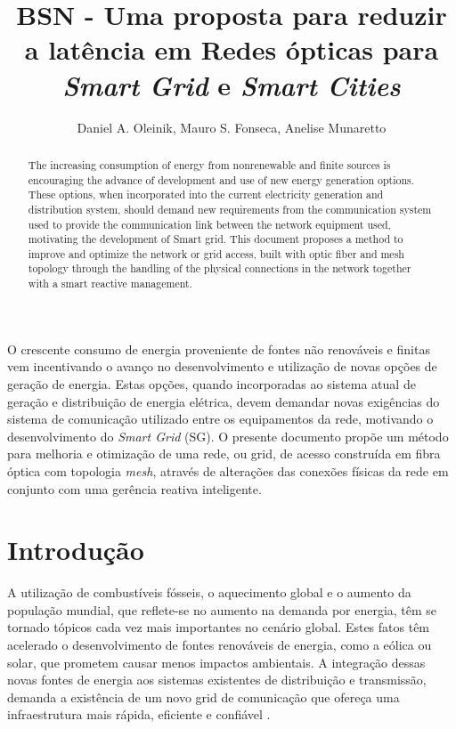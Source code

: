 \documentclass[12pt]{article}
\title{BSN - Uma proposta para reduzir a latência em Redes ópticas para \emph{Smart Grid} e \emph{Smart Cities}}
\author{Daniel A. Oleinik\inst{1}, Mauro S. Fonseca\inst{1}, Anelise Munaretto\inst{1}}
\begin{document}
 

\maketitle

\begin{abstract}
  The increasing consumption of energy from nonrenewable and finite sources is encouraging the advance of development and use
of new energy generation options. These options, when incorporated into the current electricity generation and distribution system,
should demand new requirements from the communication system used to provide the communication link between the network
equipment used, motivating the development of Smart grid. This document proposes a method to improve and optimize the network
or grid access, built with optic fiber and mesh topology through the handling of the physical connections in the network together with
a smart reactive management.
\end{abstract}
     
\begin{resumo} 
 O crescente consumo de energia proveniente de fontes não renováveis e finitas vem incentivando o avanço no desenvolvimento e utilização de novas opções de geração de energia. Estas opções, quando incorporadas ao sistema atual de geração e distribuição de energia elétrica, devem demandar novas exigências do sistema de comunicação utilizado entre os equipamentos da rede, motivando o desenvolvimento do \emph{Smart Grid} (SG). O presente documento propõe um método para melhoria e otimização de uma rede, ou grid, de acesso construída em fibra óptica com topologia \emph{mesh}, através de alterações das conexões físicas da rede em conjunto com uma gerência reativa inteligente.
\end{resumo}


\section{Introdução}

A utilização de combustíveis fósseis, o aquecimento global e o aumento da população mundial, que reflete-se no aumento na demanda por energia, têm se tornado tópicos cada vez mais importantes no cenário global. Estes fatos têm acelerado o desenvolvimento de fontes renováveis de energia, como a eólica ou solar, que prometem causar menos impactos ambientais. A integração dessas novas fontes de energia aos sistemas existentes de distribuição e transmissão, demanda a existência de um novo grid de comunicação que ofereça uma infraestrutura mais rápida, eficiente e confiável \cite{Art_Gungor2013}.
\end{document}
